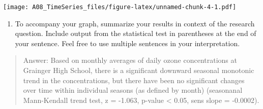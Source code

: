 \documentclass[
]{article}
\providecommand{\tightlist}{%
  \setlength{\itemsep}{0pt}\setlength{\parskip}{0pt}}
\begin{document}
\texttt{[image: A08\_TimeSeries\_files/figure-latex/unnamed-chunk-4-1.pdf]}

\begin{enumerate}
\def\labelenumi{\arabic{enumi}.}
\setcounter{enumi}{13}
\tightlist
\item
  To accompany your graph, summarize your results in context of the
  research question. Include output from the statistical test in
  parentheses at the end of your sentence. Feel free to use multiple
  sentences in your interpretation.
\end{enumerate}

\begin{quote}
Answer: Based on monthly averages of daily ozone concentrations at
Grainger High School, there is a significant downward seasonal monotonic
trend in the concentrations, but there have been no significant changes
over time within individual seasons (as defined by month) (seasonanal
Mann-Kendall trend test, z = -1.063, p-value \textless{} 0.05, sens
slope = -0.0002).
\end{quote}
\end{document}
